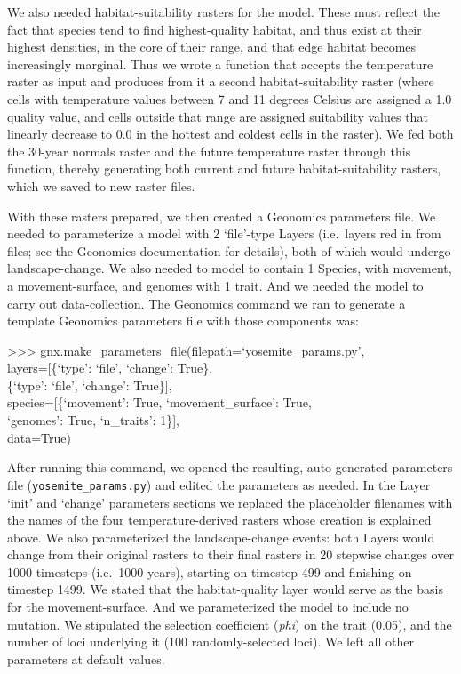 ﻿\documentclass{article}
\newenvironment{allintypewriter}{\ttfamily}{\par}
\begin{document}
We also needed habitat-suitability rasters for the model.
These must reflect the fact that species tend to find highest-quality habitat,
and thus exist at their highest densities, in the core of their range,
and that edge habitat becomes increasingly marginal. 
Thus we wrote a function that accepts the temperature raster as input and produces from
it a second habitat-suitability raster (where cells with temperature values
between 7 and 11 degrees Celsius are assigned a 1.0 quality value,
and cells outside that range are assigned suitability values that linearly decrease
to 0.0 in the hottest and coldest cells in the raster).
We fed both the 30-year normals raster and the future temperature raster through this function,
thereby generating both current and future habitat-suitability rasters,
which we saved to new raster files.

With these rasters prepared, we then created a Geonomics parameters file.
We needed to parameterize a model with 2 `file'-type Layers
(i.e.\ layers red in from files; see the Geonomics documentation for details),
both of which would undergo landscape-change.
We also needed to model to contain 1 Species,
with movement, a movement-surface, and genomes with 1 trait.
And we needed the model to carry out data-collection.
The Geonomics command we ran to generate a template Geonomics parameters
file with those components was:

\begin{allintypewriter}
>>> gnx.make\_parameters\_file(filepath=`yosemite\_params.py',\\
                               layers=[\{`type': `file', `change': True\},\\
                                       \{`type': `file', `change': True\}],\\
                               species=[\{`movement': True, `movement\_surface': True,\\
                                          `genomes': True, `n\_traits': 1\}],\\
                               data=True)\\
\end{allintypewriter}

After running this command, we opened the resulting, auto-generated parameters
file (\texttt{yosemite\_params.py}) and edited the parameters as needed.
In the Layer `init' and `change' parameters sections we replaced
the placeholder filenames with the names of the four temperature-derived
rasters whose creation is explained above.
We also parameterized the landscape-change events:
both Layers would change from their original rasters to their final
rasters in 20 stepwise changes over 1000 timesteps (i.e.\ 1000 years),
starting on timestep 499 and finishing on timestep 1499.
We stated that the habitat-quality layer would serve as the basis for the movement-surface.
And we parameterized the model to include no mutation.
We stipulated the selection coefficient (\emph{phi}) on the trait (0.05),
and the number of loci underlying it (100 randomly-selected loci).
We left all other parameters at default values.
\end{document}
